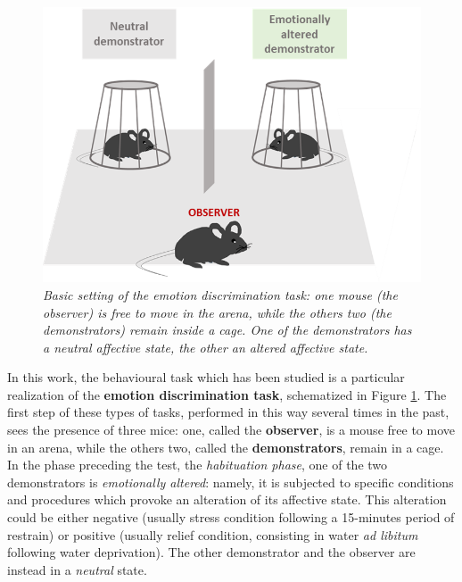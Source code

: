 \documentclass[12pt, a4paper]{report}
\begin{document}
\begin{figure}
	\begin{center}
		\includegraphics[scale=.70]{mice_task.png} 
	\end{center} 
	\caption{\textit{Basic setting of the emotion discrimination task: one mouse (the \textit{observer}) is free to move in the arena, while the others two (the \textit{demonstrators}) remain inside a cage. One of the demonstrators has a neutral affective state, the other an altered affective state.}} \label{emotion discrimination}
	
\end{figure}
In this work, the behavioural task which has been studied is a particular realization of the \textbf{emotion discrimination task}, schematized in Figure \ref*{emotion discrimination}. The first step of these types of tasks, performed in this way several times in the past, sees the presence of three mice: one, called the \textbf{observer}, is a mouse free to move in an arena, while the others two, called the \textbf{demonstrators}, remain in a cage. In the phase preceding the test, the \textit{habituation phase}, one of the two demonstrators is \textit{emotionally altered}: namely, it is subjected to specific conditions and procedures which provoke an alteration of its affective state. This alteration could be either negative (usually stress condition following a 15-minutes period of restrain) or positive (usually relief condition, consisting in water \textit{ad libitum} following water deprivation). The other demonstrator and the observer are instead in a \textit{neutral} state.\\
\end{document}

